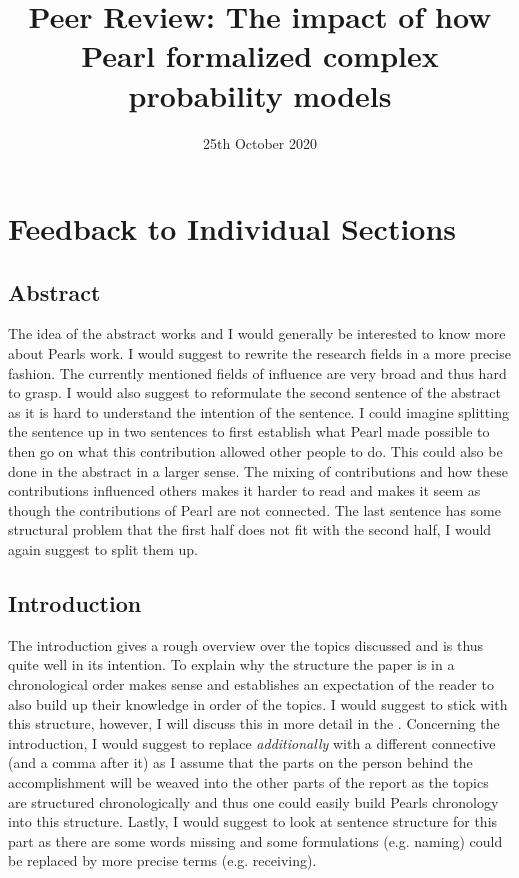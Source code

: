 \documentclass{article}
\title{Peer Review: The impact of how Pearl formalized complex probability models}
\date{25th October 2020}
\begin{document}
\maketitle

\section{Feedback to Individual Sections}


\subsection{Abstract}
The idea of the abstract works and I would generally be interested to know more about Pearls work. I would suggest to rewrite the research fields in a more precise fashion. The currently mentioned fields of influence are very broad and thus hard to grasp. I would also suggest to reformulate the second sentence of the abstract as it is hard to understand the intention of the sentence. I could imagine splitting the sentence up in two sentences to first establish what Pearl made possible to then go on what this contribution allowed other people to do. This could also be done in the abstract in a larger sense. The mixing of contributions and how these contributions influenced others makes it harder to read and makes it seem as though the contributions of Pearl are not connected. The last sentence has some structural problem that the first half does not fit with the second half, I would again suggest to split them up.

\subsection{Introduction}
The introduction gives a rough overview over the topics discussed and is thus quite well in its intention. To explain why the structure the paper is in a chronological order makes sense and establishes an expectation of the reader to also build up their knowledge in order of the topics. I would suggest to stick with this structure, however, I will discuss this in more detail in the . Concerning the introduction, I would suggest to replace \textit{additionally} with a different connective (and a comma after it) as I assume that the parts on the person behind the accomplishment will be weaved into the other parts of the report as the topics are structured chronologically and thus one could easily build Pearls chronology into this structure.
Lastly, I would suggest to look at sentence structure for this part as there are some words missing and some formulations (e.g. naming) could be replaced by more precise terms (e.g. receiving).
\end{document}
